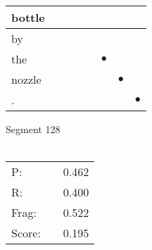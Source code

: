 \documentclass[landscape]{article}
\newcommand{\ssp}{\hspace{2pt}}
\newcommand{\mex}{\cellcolor{g}$\bullet$}
\begin{document}
\begin{tabular}{|l|p{10pt}|p{10pt}|p{10pt}|p{10pt}|p{10pt}|p{10pt}|p{10pt}|}
\hline
\ssp bottle \ssp&\hspace{2pt}&\hspace{2pt}&\hspace{2pt}&\hspace{2pt}&\hspace{2pt}&\hspace{2pt}&\hspace{2pt}\\
\hline
\ssp by \ssp&\hspace{2pt}&\hspace{2pt}&\hspace{2pt}&\hspace{2pt}&\hspace{2pt}&\hspace{2pt}&\hspace{2pt}\\
\hline
\ssp \cellcolor{ref4}the \ssp&\hspace{2pt}&\hspace{2pt}&\hspace{2pt}&\hspace{2pt}&\hspace{2pt}\mex&\hspace{2pt}&\hspace{2pt}\\
\hline
\ssp \cellcolor{ref5}nozzle \ssp&\hspace{2pt}&\hspace{2pt}&\hspace{2pt}&\hspace{2pt}&\hspace{2pt}&\hspace{2pt}\mex&\hspace{2pt}\\
\hline
\ssp \cellcolor{ref6}. \ssp&\hspace{2pt}&\hspace{2pt}&\hspace{2pt}&\hspace{2pt}&\hspace{2pt}&\hspace{2pt}&\hspace{2pt}\mex\\
\hline
\end{tabular}

\vspace{6pt}
\noindent Segment 128\\\\
\noindent\begin{tabular}{lm{12pt}r}
\hline
P:&&0.462\\
R:&&0.400\\
Frag:&&0.522\\
Score:&&0.195\\
\end{tabular}
\end{document}
